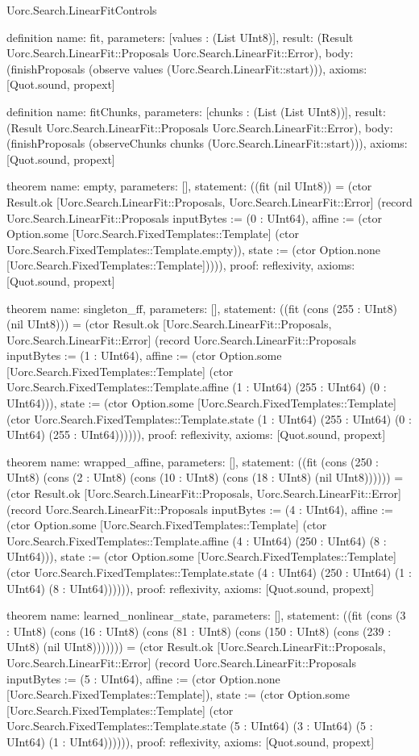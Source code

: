\begin{lexlean}{Uorc.Search.LinearFitControls}
\begin{semanticmodule}
definition{
  name: fit,
  parameters: [values : (List UInt8)],
  result: (Result Uorc.Search.LinearFit::Proposals Uorc.Search.LinearFit::Error),
  body: (finishProposals (observe values (Uorc.Search.LinearFit::start))),
  axioms: [Quot.sound, propext]
}

definition{
  name: fitChunks,
  parameters: [chunks : (List (List UInt8))],
  result: (Result Uorc.Search.LinearFit::Proposals Uorc.Search.LinearFit::Error),
  body: (finishProposals (observeChunks chunks (Uorc.Search.LinearFit::start))),
  axioms: [Quot.sound, propext]
}

theorem{
  name: empty,
  parameters: [],
  statement: ((fit (nil UInt8)) = (ctor Result.ok [Uorc.Search.LinearFit::Proposals, Uorc.Search.LinearFit::Error] (record Uorc.Search.LinearFit::Proposals {inputBytes := (0 : UInt64), affine := (ctor Option.some [Uorc.Search.FixedTemplates::Template] (ctor Uorc.Search.FixedTemplates::Template.empty)), state := (ctor Option.none [Uorc.Search.FixedTemplates::Template])}))),
  proof: reflexivity{},
  axioms: [Quot.sound, propext]
}

theorem{
  name: singleton_ff,
  parameters: [],
  statement: ((fit (cons (255 : UInt8) (nil UInt8))) = (ctor Result.ok [Uorc.Search.LinearFit::Proposals, Uorc.Search.LinearFit::Error] (record Uorc.Search.LinearFit::Proposals {inputBytes := (1 : UInt64), affine := (ctor Option.some [Uorc.Search.FixedTemplates::Template] (ctor Uorc.Search.FixedTemplates::Template.affine (1 : UInt64) (255 : UInt64) (0 : UInt64))), state := (ctor Option.some [Uorc.Search.FixedTemplates::Template] (ctor Uorc.Search.FixedTemplates::Template.state (1 : UInt64) (255 : UInt64) (0 : UInt64) (255 : UInt64)))}))),
  proof: reflexivity{},
  axioms: [Quot.sound, propext]
}

theorem{
  name: wrapped_affine,
  parameters: [],
  statement: ((fit (cons (250 : UInt8) (cons (2 : UInt8) (cons (10 : UInt8) (cons (18 : UInt8) (nil UInt8)))))) = (ctor Result.ok [Uorc.Search.LinearFit::Proposals, Uorc.Search.LinearFit::Error] (record Uorc.Search.LinearFit::Proposals {inputBytes := (4 : UInt64), affine := (ctor Option.some [Uorc.Search.FixedTemplates::Template] (ctor Uorc.Search.FixedTemplates::Template.affine (4 : UInt64) (250 : UInt64) (8 : UInt64))), state := (ctor Option.some [Uorc.Search.FixedTemplates::Template] (ctor Uorc.Search.FixedTemplates::Template.state (4 : UInt64) (250 : UInt64) (1 : UInt64) (8 : UInt64)))}))),
  proof: reflexivity{},
  axioms: [Quot.sound, propext]
}

theorem{
  name: learned_nonlinear_state,
  parameters: [],
  statement: ((fit (cons (3 : UInt8) (cons (16 : UInt8) (cons (81 : UInt8) (cons (150 : UInt8) (cons (239 : UInt8) (nil UInt8))))))) = (ctor Result.ok [Uorc.Search.LinearFit::Proposals, Uorc.Search.LinearFit::Error] (record Uorc.Search.LinearFit::Proposals {inputBytes := (5 : UInt64), affine := (ctor Option.none [Uorc.Search.FixedTemplates::Template]), state := (ctor Option.some [Uorc.Search.FixedTemplates::Template] (ctor Uorc.Search.FixedTemplates::Template.state (5 : UInt64) (3 : UInt64) (5 : UInt64) (1 : UInt64)))}))),
  proof: reflexivity{},
  axioms: [Quot.sound, propext]
}


\end{semanticmodule}
\end{lexlean}
